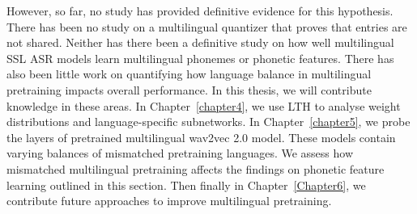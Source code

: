 However, so far, no study has provided definitive evidence for this hypothesis. There has been no study on a multilingual quantizer that proves that entries are not shared. Neither has there been a definitive study on how well multilingual SSL ASR models learn multilingual phonemes or phonetic features. There has also been little work on quantifying how language balance in multilingual pretraining impacts overall performance. In this thesis, we will contribute knowledge in these areas. In Chapter~\ref{chapter4}, we use LTH to analyse weight distributions and language-specific subnetworks. In Chapter~\ref{chapter5}, we probe the layers of pretrained multilingual wav2vec 2.0 model. These models contain varying balances of mismatched pretraining languages. We assess how mismatched multilingual pretraining affects the findings on phonetic feature learning outlined in this section. Then finally in Chapter~\ref{Chapter6}, we contribute future approaches to improve multilingual pretraining. 




